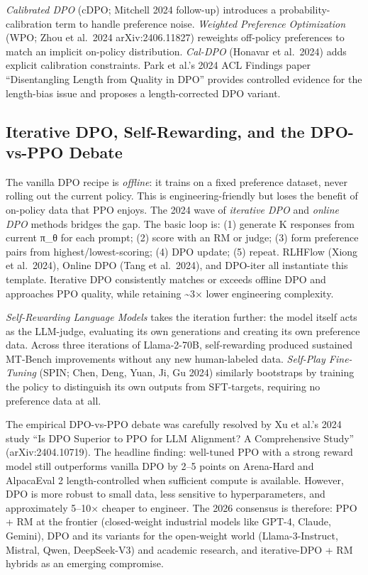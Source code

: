 \documentclass{article}
\begin{document}
\emph{Calibrated DPO} (cDPO; Mitchell 2024 follow-up) introduces a probability-calibration term to handle preference noise. \emph{Weighted Preference Optimization} (WPO; Zhou et al.~2024 arXiv:2406.11827) reweights off-policy preferences to match an implicit on-policy distribution. \emph{Cal-DPO} (Honavar et al.~2024) adds explicit calibration constraints. Park et al.'s 2024 ACL Findings paper ``Disentangling Length from Quality in DPO'' provides controlled evidence for the length-bias issue and proposes a length-corrected DPO variant.

\subsection{Iterative DPO, Self-Rewarding, and the DPO-vs-PPO Debate}\label{iterative-dpo-self-rewarding-and-the-dpo-vs-ppo-debate}

The vanilla DPO recipe is \emph{offline}: it trains on a fixed preference dataset, never rolling out the current policy. This is engineering-friendly but loses the benefit of on-policy data that PPO enjoys. The 2024 wave of \emph{iterative DPO} and \emph{online DPO} methods bridges the gap. The basic loop is: (1) generate K responses from current π\_θ for each prompt; (2) score with an RM or judge; (3) form preference pairs from highest/lowest-scoring; (4) DPO update; (5) repeat. RLHFlow (Xiong et al.~2024), Online DPO (Tang et al.~2024), and DPO-iter all instantiate this template. Iterative DPO consistently matches or exceeds offline DPO and approaches PPO quality, while retaining \textasciitilde3× lower engineering complexity.

\emph{Self-Rewarding Language Models} \citep{yuan2023rrhfrankresponsest} takes the iteration further: the model itself acts as the LLM-judge, evaluating its own generations and creating its own preference data. Across three iterations of Llama-2-70B, self-rewarding produced sustained MT-Bench improvements without any new human-labeled data. \emph{Self-Play Fine-Tuning} (SPIN; Chen, Deng, Yuan, Ji, Gu 2024) similarly bootstraps by training the policy to distinguish its own outputs from SFT-targets, requiring no preference data at all.

The empirical DPO-vs-PPO debate was carefully resolved by Xu et al.'s 2024 study ``Is DPO Superior to PPO for LLM Alignment? A Comprehensive Study'' (arXiv:2404.10719). The headline finding: well-tuned PPO with a strong reward model still outperforms vanilla DPO by 2--5 points on Arena-Hard and AlpacaEval 2 length-controlled when sufficient compute is available. However, DPO is more robust to small data, less sensitive to hyperparameters, and approximately 5--10× cheaper to engineer. The 2026 consensus is therefore: PPO + RM at the frontier (closed-weight industrial models like GPT-4, Claude, Gemini), DPO and its variants for the open-weight world (Llama-3-Instruct, Mistral, Qwen, DeepSeek-V3) and academic research, and iterative-DPO + RM hybrids as an emerging compromise.
\end{document}

